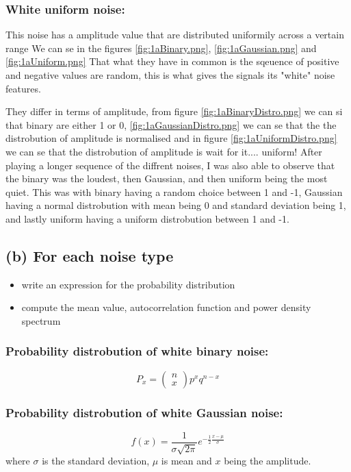 \subsubsection*{White uniform noise:}
This noise has a amplitude value that are distributed uniformily across a vertain range
We can se in the figures \ref{fig:1aBinary.png}, \ref{fig:1aGaussian.png} and \ref{fig:1aUniform.png} That what they have in common is the sqeuence of positive and negative values are random, this is what gives the signals its "white" noise features.

They differ in terms of amplitude, from figure \ref{fig:1aBinaryDistro.png} we can si that binary are either 1 or 0, \ref{fig:1aGaussianDistro.png} we can se that the the distrobution of amplitude is normalised and in figure \ref{fig:1aUniformDistro.png} we can se that the distrobution of amplitude is wait for it.... uniform! After playing a longer sequence of the diffrent noises, I was also able to observe that the binary was the loudest, then Gaussian, and then uniform being the most quiet. This was with binary having a random choice between 1 and -1, Gaussian having a normal distrobution with mean being 0 and standard deviation being 1, and lastly uniform having a uniform distrobution between 1 and -1.

\subsection*{(b) For each noise type}
\begin{itemize}
    \item write an expression for the probability distribution
    \item compute the mean value, autocorrelation function and power density spectrum
\end{itemize}

\subsubsection*{Probability distrobution of white binary noise:}
$$
P_x=\left(\begin{array}{l}
n \\ x
\end{array}\right) p^x q^{n-x}
$$
\subsubsection*{Probability distrobution of white Gaussian noise:}
$$f(x)=\frac{1}{\sigma \sqrt{2\pi}}e^{-\frac{1}{2}\frac{x-\mu}{\sigma}}$$
where $\sigma$ is the standard deviation, $\mu$ is mean and $x$ being the amplitude.

